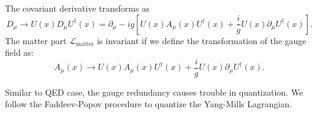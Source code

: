 The covariant derivative transforms as
\begin{equation}
	D_\mu \rightarrow U(x) D_\mu U^\dagger(x)
	=\partial_\mu - i g \left[U(x) A_\mu(x) U^\dagger(x) + \frac{i}{g} U(x)\partial_\mu U^\dagger(x)\right].
\end{equation}
The matter part $\mathcal L_{\mathrm{matter}}$ is invariant if we define the transformation of the gauge field as:
\begin{equation}\label{eq:SM-YM-GT-1}
	A_\mu(x) \rightarrow U(x) A_\mu(x) U^\dagger(x) + \frac{i}{g} U(x)\partial_\mu U^\dagger(x).
\end{equation}

Similar to QED case, the gauge redundancy causes trouble in quantization.
We follow the Faddeev-Popov procedure to quantize the Yang-Mills Lagrangian.

